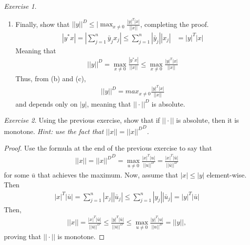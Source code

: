 \documentclass[11pt]{article}
\theoremstyle{plain}
\theoremstyle{definition}
\theoremstyle{remark}
\newtheorem{exc}{Exercise}[section]
\begin{document}
\begin{exc}
\begin{enumerate}
\begin{proof}
\begin{align*}
            \end{align*}
        \end{proof}
        \item Finally, show that $||y||^D\leq |\max_{x \neq 0} \frac{|y|^T |x|}{||x||}$, completing the proof.
        \begin{align*}
            |y^* x| = \left|\sum_{j=1}^n \bar{y}_j x_j \right| \leq \sum_{j=1}^n |\bar{y}_j| |x_j| &= |y|^T |x|
        \end{align*}
        Meaning that
        \begin{align*}
            ||y||^D = \max_{x \neq 0} \frac{|y^* x|}{||x||} \leq \max_{x \neq 0} \frac{ |y|^T |x|}{||x||}
        \end{align*}
        Thus, from (b) and (c), 
        \begin{align*}
            ||y||^D = max_{x \neq 0} \frac{ |y|^T |x|}{||x||}
        \end{align*}
        and depends only on $|y|$, meaning that $||\cdot||^D$ is absolute.
    \end{enumerate}
\end{exc}

\begin{exc}
    Using the previous exercise, show that if $||\cdot||$ is absolute, then it is monotone. {\it Hint: use the fact that $||x|| = {||x||^D}^D$.}
    \begin{proof}
        Use the formula at the end of the previous exercise to say that
        \begin{align*}
            ||x|| = {||x||^D}^D = \max_{u \neq 0} \frac{ |x|^T |u|}{||u||^D} = \frac{ |x|^T |\bar{u}|}{||\bar{u}||^D}
        \end{align*}
        for some $\bar{u}$ that achieves the maximum. Now, assume that $|x| \leq |y|$ element-wise. Then
        \begin{align*}
            |x|^T |\bar{u}| = \sum_{j=1}^n |x_j| |\bar{u}_j| \leq \sum_{j=1}^n |y_j| |\bar{u}_j| = |y|^T |\bar{u}|
        \end{align*}
        Then,
        \begin{align*}
            ||x|| = \frac{ |x|^T |\bar{u}|}{||\bar{u}||^D} \leq \frac{ |y|^T |\bar{u}|}{||\bar{u}||^D} \leq \max_{u \neq 0} \frac{ |y|^T |u|}{||u||^D} = ||y||,
        \end{align*}
        proving that $||\cdot||$ is monotone.
    \end{proof}
\end{exc}
\end{document}
